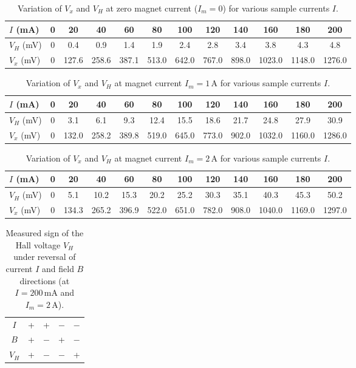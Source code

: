\documentclass[a4paper,11pt]{article}
\begin{document}
\begin{table}[H]
\centering	
\caption{Variation of \(V_x\) and \(V_H\) at zero magnet current (\(I_m = 0\)) for various sample currents \(I\).}
\label{tab:hall_zero}
\begin{tabular}{l *{11}{c}}
\toprule
\(I\) (mA) & 0 & 20 & 40 & 60 & 80 & 100 & 120 & 140 & 160 & 180 & 200 \\
\midrule
\(V_H\) (mV) & 0 & 0.4 & 0.9 & 1.4 & 1.9 &  2.4 & 2.8 & 3.4 & 3.8 & 4.3 & 4.8 \\
\(V_x\) (mV) & 0 & 127.6 & 258.6 & 387.1 & 513.0 & 642.0 & 767.0 & 898.0 & 1023.0 & 1148.0 & 1276.0 \\
\bottomrule
\end{tabular}
\end{table}

\begin{table}[H]
\centering
\caption{Variation of \(V_x\) and \(V_H\) at magnet current \(I_m = 1\)\,A for various sample currents \(I\).}
\label{tab:hall_1A}
\begin{tabular}{l *{11}{c}}
\toprule
\(I\) (mA) & 0 & 20 & 40 & 60 & 80 & 100 & 120 & 140 & 160 & 180 & 200 \\
\midrule
\(V_H\) (mV) & 0 & 3.1 & 6.1 & 9.3 & 12.4 & 15.5 & 18.6 & 21.7 & 24.8 & 27.9 & 30.9 \\
\(V_x\) (mV) & 0 & 132.0 & 258.2 & 389.8 & 519.0 & 645.0 & 773.0 & 902.0 & 1032.0 & 1160.0 & 1286.0 \\
\bottomrule
\end{tabular}
\end{table}

\begin{table}[H]
\centering
\caption{Variation of \(V_x\) and \(V_H\) at magnet current \(I_m = 2\)\,A for various sample currents \(I\).}
\label{tab:hall_2A}
\begin{tabular}{l *{11}{c}}
\toprule
\(I\) (mA) & 0 & 20 & 40 & 60 & 80 & 100 & 120 & 140 & 160 & 180 & 200 \\
\midrule
\(V_H\) (mV) & 0 & 5.1 & 10.2 & 15.3 & 20.2 & 25.2 & 30.3 & 35.1 & 40.3 & 45.3 & 50.2  \\
\(V_x\) (mV) & 0 & 134.3 & 265.2 & 396.9 & 522.0 & 651.0 & 782.0 & 908.0 & 1040.0 & 1169.0 & 1297.0 \\
\bottomrule
\end{tabular}
\end{table}

\begin{table}[H]
\centering
\caption{Measured sign of the Hall voltage \(V_H\) under reversal of current \(I\) and field \(B\) directions (at \(I = 200\)\,mA and \(I_m = 2\)\,A).}
\label{tab:sign}
\begin{tabular}{ccccc}
\toprule
\(I\) & + & + & $-$ & $-$ \\
\(B\) & + & $-$ & + & $-$ \\
\midrule
\(V_H\) & + & $-$ & $-$ & + \\
\bottomrule
\end{tabular}
\end{table}
\end{document}
